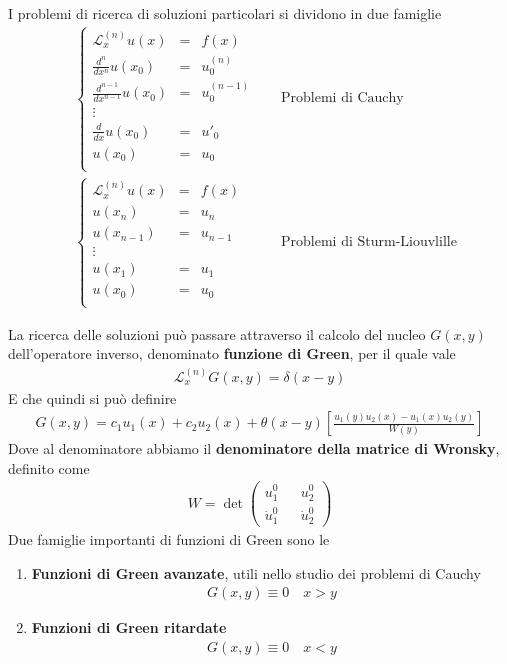 I problemi di ricerca di soluzioni particolari si dividono in due famiglie
\begin{align}
 	&\left\{
 		\begin{array}{ccc}
 			\mathcal{L}_x^{(n)} u(x) &= &f(x)\\
 			\frac{d^n}{dx^n}u(x_0) &= &u^{(n)}_0\\
 			\frac{d^{n-1}}{dx^{n-1}}u(x_0) &= &u^{(n-1)}_0\\
 			\vdots\\
 			\frac{d}{dx}u(x_0) &= &u'_0\\
			u(x_0) &= &u_0\\
 		\end{array}
 	\right. \quad &\text{Problemi di Cauchy}\\
 	&\left\{
		\begin{array}{ccc}
			\mathcal{L}_x^{(n)} u(x) &= &f(x)\\
			u(x_n) &= &u_n\\
			u(x_{n-1}) &= &u_{n-1}\\
			\vdots\\
			u(x_1) &= &u_1\\
			u(x_0) &= &u_0\\
		\end{array}
		\right. \quad &\text{Problemi di Sturm-Liouvlille}
\end{align}

La ricerca delle soluzioni può passare attraverso il calcolo del nucleo $G(x,y)$ dell'operatore inverso, denominato \textbf{funzione di Green}, per il quale vale
\begin{align}
	\mathcal{L}_x^{(n)} G(x,y) = \delta(x-y)
\end{align}
E che quindi si può definire
\begin{align}
	G(x,y) = c_1 u_1(x) + c_2 u_2(x) + \theta(x-y) \left[ \frac{u_1(y)u_2(x) - u_1(x)u_2(y)}{W(y)} \right]
\end{align}
Dove al denominatore abbiamo il \textbf{denominatore della matrice di Wronsky}, definito come
\begin{align}
	W = \det \begin{pmatrix}
		u_1^0 && u_2^0\\
		\dot{u}_1^0 && \dot{u}_2^0
	\end{pmatrix}
\end{align}
Due famiglie importanti di funzioni di Green sono le
\begin{enumerate}
	\item \textbf{Funzioni di Green avanzate}, utili nello studio dei problemi di Cauchy
		\begin{align}
			G(x,y) \equiv 0 \quad x>y
		\end{align}
	\item \textbf{Funzioni di Green ritardate}
\begin{align}
	G(x,y) \equiv 0 \quad x<y
\end{align}
\end{enumerate}


